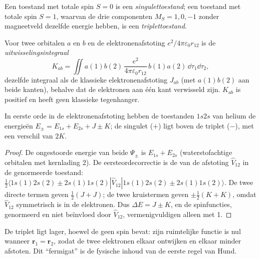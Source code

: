 \begin{definition}\label{def:b3:many-electron-atoms:singlet-triplet}
Een toestand met totale spin $S = 0$ is een
\emph{singulettoestand}; een toestand met totale
spin $S = 1$, waarvan de drie componenten $M_S = 1, 0, -1$ zonder
magneetveld dezelfde energie hebben, is een
\emph{triplettoestand}.
\end{definition}

\begin{definition}[Uitwisselingsintegraal]\label{def:b3:many-electron-atoms:exchange}
Voor twee orbitalen $a$ en $b$ en de elektronenafstoting $e^2/4\pi\varepsilon_0
r_{12}$ is de \emph{uitwisselingsintegraal}
\[
K_{ab} = \iint a(1)b(2)\,\frac{e^2}{4\pi\varepsilon_0r_{12}}\,b(1)a(2)\,\dd\tau_1\dd\tau_2,
\]
dezelfde integraal als de klassieke elektronenafstoting $J_{ab}$ (met
$a(1)b(2)$ aan beide kanten), behalve dat de elektronen aan één kant
verwisseld zijn. $K_{ab}$ is positief en heeft geen klassieke tegenhanger.
\end{definition}

\begin{proposition}\label{prop:b3:many-electron-atoms:helium}
In eerste orde in de elektronenafstoting hebben de toestanden $1s2s$ van
helium de energieën $E_\pm = E_{1s} + E_{2s} + J \pm K$; de singulet ($+$)
ligt boven de
triplet ($-$), met een verschil van $2K$.
\end{proposition}

\begin{proof}
De ongestoorde energie van beide $\Psi_\pm$ is $E_{1s} + E_{2s}$
(waterstofachtige orbitalen met kernlading 2). De eersteordecorrectie is
de  van de afstoting $\hat V_{12}$ in de genormeerde toestand:
$\frac12\langle 1s(1)2s(2) \pm 2s(1)1s(2)|\hat V_{12}|1s(1)2s(2) \pm
2s(1)1s(2)\rangle$. De twee directe termen geven $\frac12(J + J)$; de twee
kruistermen geven $\pm\frac12(K + K)$, omdat $\hat V_{12}$ symmetrisch is in de
elektronen. Dus $\Delta E = J \pm K$, en de spinfuncties, genormeerd en
niet beïnvloed door $\hat V_{12}$, vermenigvuldigen alleen met 1.
\end{proof}

De triplet ligt lager, hoewel de  geen spin bevat: zijn
ruimtelijke functie is nul wanneer $\mathbf r_1 = \mathbf r_2$, zodat de
twee elektronen elkaar ontwijken en elkaar minder afstoten. Dit
``fermigat'' is de fysische inhoud van de eerste regel van Hund.


